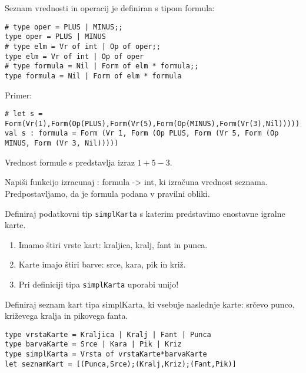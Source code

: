 \begin{ex}
Seznam vrednosti in operacij je definiran s tipom formula: 

\begin{lstlisting}
# type oper = PLUS | MINUS;; 
type oper = PLUS | MINUS 
# type elm = Vr of int | Op of oper;; 
type elm = Vr of int | Op of oper 
# type formula = Nil | Form of elm * formula;; 
type formula = Nil | Form of elm * formula 
\end{lstlisting}

Primer: 
\begin{lstlisting}
# let s = Form(Vr(1),Form(Op(PLUS),Form(Vr(5),Form(Op(MINUS),Form(Vr(3),Nil)))));;
val s : formula = Form (Vr 1, Form (Op PLUS, Form (Vr 5, Form (Op MINUS, Form (Vr 3, Nil))))) 
\end{lstlisting}
Vrednost formule s predstavlja izraz $1+5-3$. 

Napi\v si funkcijo izracunaj : formula -> int, ki izra\v cuna vrednost seznama. Predpostavljamo, da je formula podana v pravilni obliki.



\end{ex}
\begin{ex}
Definiraj podatkovni tip \lstinline{simplKarta} s katerim predstavimo enostavne igralne karte. 
\begin{enumerate}
\item Imamo \v stiri vrste kart: kraljica, kralj, fant in punca. 
\item Karte imajo \v stiri barve: srce, kara, pik in kri\v z. 
\item Pri definiciji tipa \lstinline{simplKarta} uporabi unijo!
\end{enumerate}

Definiraj seznam kart tipa simplKarta, ki vsebuje naslednje karte: sr\v cevo punco, kri\v zevega kralja in pikovega fanta. 

\begin{sol}
\begin{lstlisting}
type vrstaKarte = Kraljica | Kralj | Fant | Punca
type barvaKarte = Srce | Kara | Pik | Kriz
type simplKarta = Vrsta of vrstaKarte*barvaKarte
let seznamKart = [(Punca,Srce);(Kralj,Kriz);(Fant,Pik)]
\end{lstlisting}
\end{sol}


\end{ex}
